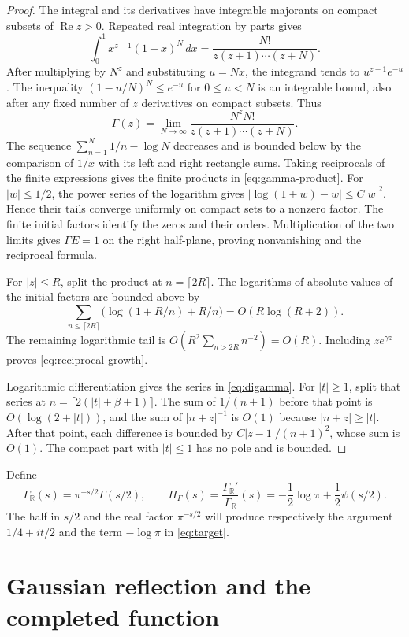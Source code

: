 \documentclass[11pt]{article}
\numberwithin{equation}{section}
\newcommand{\R}{\mathbb R}
\begin{document}
\begin{proof}
The integral and its derivatives have integrable majorants on compact
subsets of $\operatorname{Re}z>0$.
Repeated real integration by parts gives
\[
 \int_0^1 x^{z-1}(1-x)^N\,dx
       =\frac{N!}{z(z+1)\cdots(z+N)}.
\]
After multiplying by $N^z$ and substituting $u=Nx$, the integrand tends to
$u^{z-1}e^{-u}$.  The inequality $(1-u/N)^N\leq e^{-u}$ for $0\leq u<N$
is an integrable bound, also after any fixed number of $z$ derivatives
on compact subsets.  Thus
\[
 \Gamma(z)=\lim_{N\to\infty}
        \frac{N^zN!}{z(z+1)\cdots(z+N)}.
\]
The sequence $\sum_{n=1}^N1/n-\log N$ decreases and is bounded below
by the comparison of $1/x$ with its left and right rectangle sums.
Taking reciprocals of the finite expressions gives the finite products
in \eqref{eq:gamma-product}.
For $|w|\leq1/2$, the power series of the logarithm gives
$|\log(1+w)-w|\leq C|w|^2$.
Hence their tails converge uniformly on compact sets to a nonzero factor.
The finite initial factors identify the zeros and their orders.
Multiplication of the two limits gives $\Gamma E=1$ on the right half-plane,
proving nonvanishing and the reciprocal formula.

For $|z|\leq R$, split the product at $n=\lceil2R\rceil$.
The logarithms of absolute values of the initial factors are bounded above by
\[
 \sum_{n\leq\lceil2R\rceil}
       \bigl(\log(1+R/n)+R/n\bigr)=O(R\log(R+2)).
\]
The remaining logarithmic tail is $O(R^2\sum_{n>2R}n^{-2})=O(R)$.
Including $z e^{\gamma z}$ proves \eqref{eq:reciprocal-growth}.

Logarithmic differentiation gives the series in \eqref{eq:digamma}.
For $|t|\geq1$, split that series at $n=\lceil2(|t|+\beta+1)\rceil$.
The sum of $1/(n+1)$ before that point is $O(\log(2+|t|))$,
and the sum of $|n+z|^{-1}$ is $O(1)$ because $|n+z|\geq|t|$.
After that point, each difference is bounded by $C|z-1|/(n+1)^2$,
whose sum is $O(1)$.
The compact part with $|t|\leq1$ has no pole and is bounded.
\end{proof}

Define
\begin{equation}
 \Gamma_{\R}(s)=\pi^{-s/2}\Gamma(s/2),\qquad
 H_\Gamma(s)=\frac{\Gamma_{\R}'}{\Gamma_{\R}}(s)
          =-\frac12\log\pi+\frac12\psi(s/2).
 \label{eq:gamma-real}
\end{equation}
The half in $s/2$ and the real factor $\pi^{-s/2}$ will produce respectively
the argument $1/4+it/2$ and the term $-\log\pi$ in \eqref{eq:target}.

\section{Gaussian reflection and the completed function}
\label{sec:theta}
\end{document}
